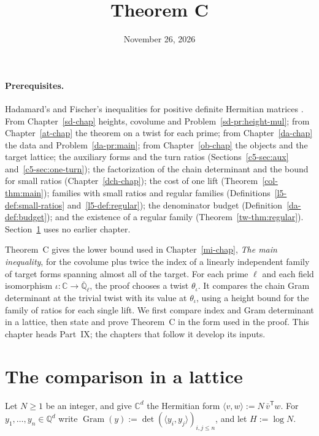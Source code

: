 \documentclass[reqno]{amsart}
\title{Theorem C}
\author{}
\date{November 26, 2026}
\newcounter{chap}
\theoremstyle{definition}
\theoremstyle{plain}
\newcommand{\Q}{{\mathbb{Q}}}
\newcommand{\C}{{\mathbb{C}}}
\newcommand{\Gram}{\operatorname{Gram}}
\begin{document}
\maketitle
{}\label{chap}

\paragraph{Prerequisites.}
Hadamard's and Fischer's inequalities for positive definite Hermitian matrices \cite[\S7.8]{HJ}.  From Chapter~\ref{sd-chap} heights, covolume and Problem~\ref{sd-pr:height-mul}; from Chapter~\ref{at-chap} the theorem on a twist for each prime; from Chapter~\ref{da-chap} the data and Problem~\ref{da-pr:main}; from Chapter~\ref{ob-chap} the objects and the target lattice; the auxiliary forms and the turn ratios (Sections~\ref{c5-sec:aux} and~\ref{c5-sec:one-turn}); the factorization of the chain determinant and the bound for small ratios (Chapter~\ref{dch-chap}); the cost of one lift (Theorem~\ref{col-thm:main}); families with small ratios and regular families (Definitions~\ref{l5-def:small-ratios} and~\ref{l5-def:regular}); the denominator budget (Definition~\ref{da-def:budget}); and the existence of a regular family (Theorem~\ref{tw-thm:regular}).  Section~\ref{sec:toy} uses no earlier chapter.

\medskip
Theorem~C gives the lower bound used in Chapter~\ref{mi-chap}, \emph{The main inequality}, for the covolume plus twice the index of a linearly independent family of target forms spanning almost all of the target.  For each prime \(\ell\) and each field isomorphism \(\iota\colon\C\to\overline{\Q}_\ell\), the proof chooses a twist \(\theta_\iota\).  It compares the chain Gram determinant at the trivial twist with its value at \(\theta_\iota\), using a height bound for the family of ratios for each single lift.  We first compare index and Gram determinant in a lattice, then state and prove Theorem~C in the form used in the proof.  This chapter heads Part~IX; the chapters that follow it develop its inputs.

\section{The comparison in a lattice}\label{sec:toy}

Let \(N \ge 1\) be an integer, and give \(\C^d\) the Hermitian form \(\langle v, w \rangle := N\, \bar v^{\mathsf T} w\).  For \(y_1, \dots, y_n \in \Q^d\) write \(\Gram(y) := \det(\langle y_i, y_j \rangle)_{i,j \le n}\), and let \(H := \log N\).
\end{document}
